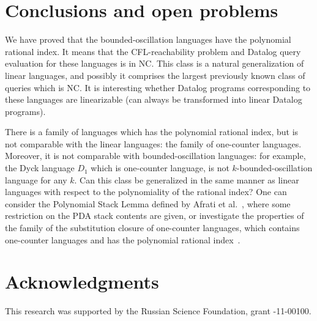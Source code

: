 \documentclass{ws-ijfcs}
\begin{document}
\section{Conclusions and open problems}
\label{sec:conc}

We have proved that the bounded-oscillation languages have the polynomial rational index. It means that the CFL-reachability problem and Datalog query evaluation for these languages is in NC. This class is a natural generalization of linear languages, and possibly it comprises the largest previously known class of queries which is NC. It is interesting whether Datalog programs corresponding to these languages are linearizable (can always be transformed into linear Datalog programs).


There is a family of languages which has the polynomial rational index, but is not comparable with the linear languages: the family of one-counter languages. Moreover, it is not comparable with bounded-oscillation languages: for example, the Dyck language $D_1$ which is one-counter language, is not $k$-bounded-oscillation language for any $k$. Can this class be generalized in the same manner as linear languages with respect to the polynomiality of the rational index? One can consider the Polynomial Stack Lemma defined by Afrati et al.~\cite{ChainQ}, where some restriction on the PDA stack contents are given, or investigate the properties of the family of the substitution closure of one-counter languages, which contains one-counter languages and has the polynomial rational index~\cite{RatBasic}. 




\section*{Acknowledgments}
This research was supported by the Russian Science Foundation, grant -11-00100.



  

\end{document}

